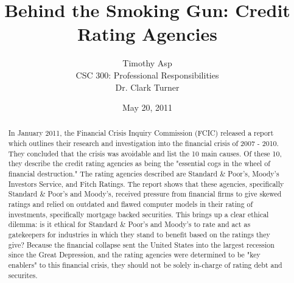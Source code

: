 \documentclass[11pt]{article}
\begin{document}
\title{\vfill Behind the Smoking Gun: Credit Rating Agencies} %
\author{
Timothy Asp\vspace{10pt} \\
CSC 300: Professional Responsibilities\vspace{10pt} \\
Dr. Clark Turner\vspace{10pt} \\
}
\date{May 20, 2011}

\maketitle

\vfill  %
\begin{abstract}
In January 2011, the Financial Crisis Inquiry Commission (FCIC) released a report which outlines their research and investigation into the financial crisis of 2007 - 2010.  They concluded that the crisis was avoidable and list the 10 main causes.\cite[p.~417-418]{govtReport}  Of these 10, they describe the credit rating agencies as being the "essential cogs in the wheel of financial destruction."\cite[p.~xxv]{govtReport} The rating agencies described are Standard \& Poor's, Moody's Investors Service, and Fitch Ratings.  The report shows that these agencies, specifically Standard \& Poor's and Moody's, received pressure from financial firms to give skewed ratings \cite{ratingEthics, hRatingEthics} and relied on outdated and flawed computer models in their rating of investments, specifically mortgage backed securities. \cite[p.~xxv]{govtReport}  This brings up a clear ethical dilemma: is it ethical for Standard \& Poor's and Moody's to rate and act as gatekeepers for industries in which they stand to benefit based on the ratings they give?  Because the financial collapse sent the United States into the largest recession since the Great Depression, and the rating agencies were determined to be "key enablers" to this financial crisis, they should not be solely in-charge of rating debt and securites. 
\end{abstract}

\thispagestyle{empty} %
\newpage


\thispagestyle{empty}  %
\tableofcontents
\end{document}
